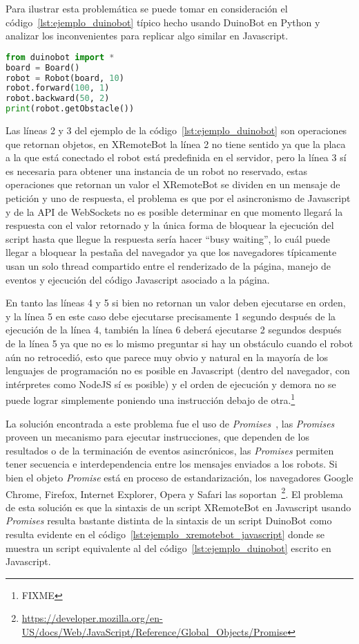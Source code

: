 Para ilustrar esta problemática se puede tomar en consideración el 
código~\ref{lst:ejemplo_duinobot}
típico hecho usando DuinoBot en Python y analizar los inconvenientes para replicar
algo similar en Javascript.

\begin{lstlisting}[language=Python,
caption={Ejemplo típico usando DuinoBot},label=lst:ejemplo_duinobot]
from duinobot import *
board = Board()
robot = Robot(board, 10)
robot.forward(100, 1)
robot.backward(50, 2)
print(robot.getObstacle())
\end{lstlisting}


Las líneas 2 y 3 del ejemplo de la código~\ref{lst:ejemplo_duinobot} son
operaciones que retornan objetos, en XRemoteBot la línea 2 no tiene sentido
ya que la placa a la que está conectado el robot está predefinida en el
servidor, pero la línea 3 sí es necesaria para obtener una instancia de un
robot no reservado, estas operaciones que retornan un valor el XRemoteBot
se dividen en un mensaje de petición y uno de respuesta, el problema
es que por el asincronismo de Javascript y de la API de WebSockets no
es posible determinar en que momento llegará la respuesta con el valor
retornado y la única forma de bloquear la ejecución del script hasta que
llegue la respuesta sería hacer ``busy waiting'', lo cuál puede llegar a
bloquear la pestaña del navegador ya que los navegadores típicamente usan
un solo thread compartido entre el renderizado de la página, manejo de
eventos y ejecución del código Javascript asociado a la página.

En tanto las líneas 4 y 5 si bien no retornan un valor deben ejecutarse
en orden, y la línea 5 en este caso debe ejecutarse precisamente 1 segundo
después de la ejecución de la línea 4, también la línea 6 deberá ejecutarse
2 segundos después de la línea 5 ya que no es lo mismo preguntar si hay
un obstáculo cuando el robot aún no retrocedió, esto que parece muy obvio
y natural en la mayoría de los lenguajes de programación no es posible
en Javascript (dentro del navegador, con intérpretes como NodeJS sí es
posible) y el orden de ejecución y demora no se puede lograr simplemente
poniendo una instrucción debajo de otra.\footnote{FIXME}


La solución encontrada a este problema fue el uso de
\textit{Promises}~\citep{ECMA-262},
las \textit{Promises} proveen un mecanismo para ejecutar instrucciones,
que dependen de los resultados o de la terminación de eventos asincrónicos,
las \textit{Promises} permiten tener secuencia e interdependencia entre los
mensajes enviados a los
robots.
Si bien el objeto \textit{Promise} está en proceso de estandarización,
los navegadores Google Chrome, Firefox, Internet Explorer, Opera y Safari las
soportan~\footnote{\url{https://developer.mozilla.org/en-US/docs/Web/JavaScript/Reference/Global_Objects/Promise}}.
El problema de esta solución es que la sintaxis de un script XRemoteBot en
Javascript usando \textit{Promises}
resulta bastante distinta de la sintaxis de un script DuinoBot como resulta
evidente
en el código~\ref{lst:ejemplo_xremotebot_javascript} donde se muestra un
script equivalente
al del código~\ref{lst:ejemplo_duinobot} escrito en Javascript.

